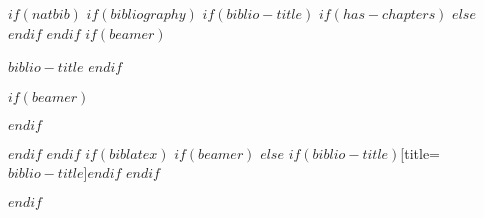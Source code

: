 $if(natbib)$
$if(bibliography)$
$if(biblio-title)$
$if(has-chapters)$
\renewcommand\bibname{$biblio-title$}
$else$
\renewcommand\refname{$biblio-title$}
$endif$
$endif$
$if(beamer)$
\begin{frame}[allowframebreaks]{$biblio-title$}
  \bibliographytrue
$endif$
  
$if(beamer)$
\end{frame}
$endif$

$endif$
$endif$
$if(biblatex)$
$if(beamer)$
$else$
\printbibliography$if(biblio-title)$[title=$biblio-title$]$endif$
$endif$

$endif$